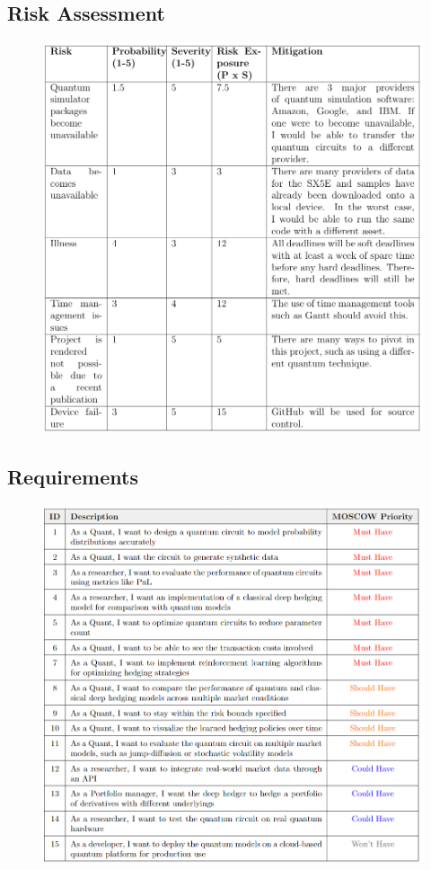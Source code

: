\documentclass[12pt]{article}
\numberwithin{equation}{section}
\begin{document}
\subsection{Risk Assessment}
\begin{figure}[h]
    \centering
    \includegraphics[scale=1]{RiskAssess.png}
\end{figure}


\clearpage
\subsection{Requirements}
\begin{figure}[h]
    \centering
    \includegraphics[scale=1.1, width=\textwidth]{requirements.png}
\end{figure}
\end{document}
